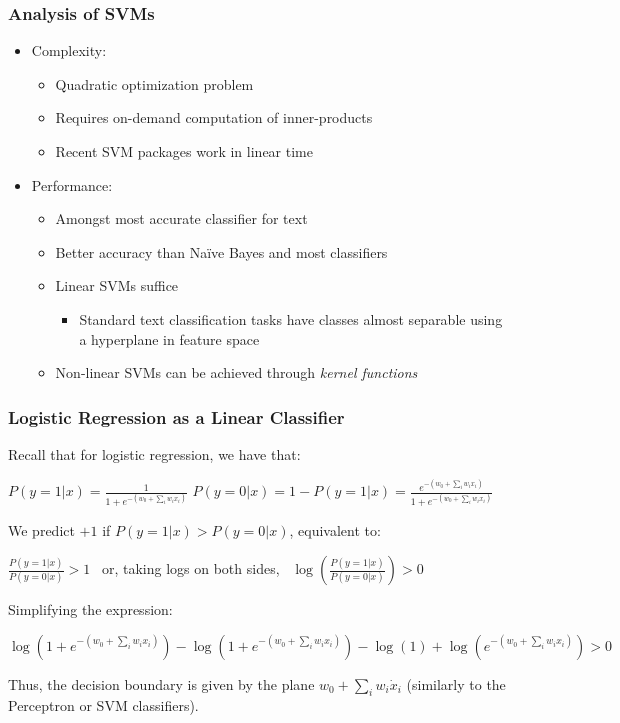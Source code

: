 \documentclass{beamer}
\begin{document}

\begin{frame} \frametitle{Analysis of SVMs}
  
  \begin{itemize}
  \item Complexity:
    \begin{itemize}
    \item Quadratic optimization problem
    \item Requires on-demand computation of inner-products
    \item Recent SVM packages work in linear time
    \end{itemize}
  \item Performance:
    \begin{itemize}
    \item Amongst most accurate classifier for text
    \item Better accuracy than Na{\"i}ve Bayes and most classifiers
    \item Linear SVMs suffice
      \begin{itemize}
      \item Standard text classification tasks have classes almost separable
        using a hyperplane in feature space
      \end{itemize}
    \item Non-linear SVMs can be achieved through \emph{kernel functions}
    \end{itemize}
  \end{itemize}

\end{frame}

\begin{frame} \frametitle{Logistic Regression as a Linear Classifier}
Recall that for logistic regression, we have that:
\begin{center}
$P(y=1|x) = \frac{1}{1 + e^{-(w_0 + \sum_iw_ix_i)}}$
$P(y=0|x) = 1 - P(y=1|x) = \frac{e^{-(w_0 + \sum_iw_ix_i)}}{1 + e^{-(w_0 + \sum_iw_ix_i)}}$
\end{center}
We predict $+1$ if $P(y=1|x)>P(y=0|x)$, equivalent to:
\begin{center}
$\frac{P(y=1|x)}{P(y=0|x)} > 1$ ~or, taking logs on both sides,~ $\log \left( \frac{P(y=1|x)}{P(y=0|x)} \right) > 0$
\end{center}
Simplifying the expression:
\begin{center}
\footnotesize
$\log(1+e^{-(w_0 + \sum_iw_ix_i)}) - \log(1+e^{-(w_0 + \sum_iw_ix_i)}) - \log(1) +  \log(e^{-(w_0 + \sum_iw_ix_i)}) > 0$
\end{center}
Thus, the decision boundary is given by the plane $w_0 + \sum_i w_i \dot x_i$ (similarly to the Perceptron or SVM classifiers).
\end{frame}
\end{document}
